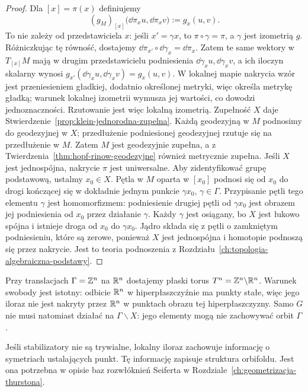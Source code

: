 \begin{proof}
Dla $[x]=\pi(x)$ definiujemy
\[
 (g_M)_{[x]}\bigl(\dd\pi_x u,\dd\pi_x v\bigr)
 :=g_x(u,v).
\]
To nie zależy od przedstawiciela $x$: jeśli $x'=\gamma x$,
to $\pi\circ\gamma=\pi$, a $\gamma$ jest izometrią $g$.
Różniczkując tę równość, dostajemy
$\dd\pi_{x'}\circ\dd\gamma_x=\dd\pi_x$.
Zatem te same wektory w $T_{[x]}M$ mają w drugim
przedstawicielu podniesienia $\dd\gamma_xu,\dd\gamma_xv$,
a ich iloczyn skalarny wynosi
$g_{x'}(\dd\gamma_xu,\dd\gamma_xv)=g_x(u,v)$.
W lokalnej mapie nakrycia wzór jest przeniesieniem
gładkiej, dodatnio określonej metryki, więc określa
metrykę gładką; warunek lokalnej izometrii wymusza jej wartości,
co dowodzi jednoznaczności.
Rzutowanie jest więc lokalną izometrią.
Zupełność $X$ daje
Stwierdzenie~\ref{prop:klein-jednorodna-zupelna}.
Każdą geodezyjną w $M$ podnosimy do geodezyjnej w $X$;
przedłużenie podniesionej geodezyjnej rzutuje się na
przedłużenie w $M$. Zatem $M$ jest geodezyjnie zupełna,
a z Twierdzenia~\ref{thm:hopf-rinow-geodezyjne} również
metrycznie zupełna. Jeśli $X$ jest jednospójna, nakrycie
$\pi$ jest uniwersalne. Aby zidentyfikować grupę podstawową,
ustalmy $x_0\in X$. Pętla w $M$ oparta w $[x_0]$ podnosi się
od $x_0$ do drogi kończącej się w dokładnie jednym punkcie
$\gamma x_0$, $\gamma\in\Gamma$. Przypisanie pętli tego
elementu $\gamma$ jest homomorfizmem: podniesienie drugiej
pętli od $\gamma x_0$ jest obrazem jej podniesienia od $x_0$
przez działanie $\gamma$. Każdy $\gamma$ jest osiągany, bo
$X$ jest łukowo spójna i istnieje droga od $x_0$ do
$\gamma x_0$. Jądro składa się z pętli o zamkniętym
podniesieniu, które są zerowe, ponieważ $X$ jest jednospójna
i homotopie podnoszą się przez nakrycie. Jest to teoria
podnoszenia z Rozdziału~\ref{ch:topologia-algebraiczna-podstawy}.
\end{proof}

Przy translacjach $\Gamma=\mathbb{Z}^n$ na $\mathbb{R}^n$ dostajemy płaski
torus $T^n=\mathbb{Z}^n\backslash\mathbb{R}^n$. Warunek swobody jest istotny:
odbicie $\mathbb{R}^n$ w hiperpłaszczyźnie ma punkty stałe, więc jego
iloraz nie jest nakryty przez $\mathbb{R}^n$ w punktach obrazu tej
hiperpłaszczyzny. Samo $G$ nie musi natomiast działać na
$\Gamma\backslash X$: jego elementy mogą nie zachowywać
orbit $\Gamma$.

Jeśli stabilizatory nie są trywialne, lokalny iloraz zachowuje
informację o symetriach ustalających punkt. Tę informację zapisuje
struktura orbifoldu. Jest ona potrzebna w opisie baz rozwłóknień
Seiferta w Rozdziale~\ref{ch:geometrizacja-thurstona}.

